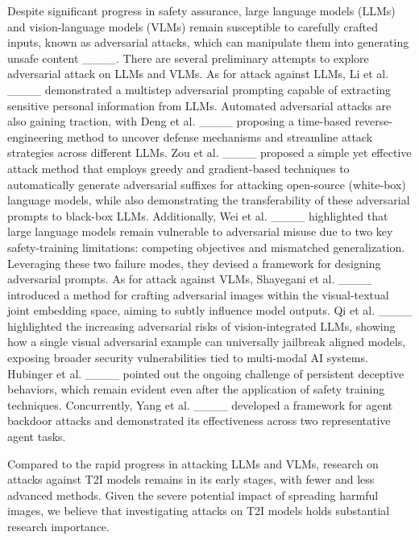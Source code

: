 Despite significant progress in safety assurance, large language models (LLMs) and vision-language models (VLMs) remain susceptible to carefully crafted inputs, known as adversarial attacks, which can manipulate them into generating unsafe content ____. There are several preliminary attempts to explore adversarial attack on LLMs and VLMs.
As for attack against LLMs, Li et al. ____ demonstrated a multistep adversarial prompting capable of extracting sensitive personal information from LLMs. 
Automated adversarial attacks are also gaining traction, with Deng et al. ____ proposing a time-based reverse-engineering method to uncover defense mechanisms and streamline attack strategies across different LLMs.
Zou et al. ____ proposed a simple yet effective attack method that employs greedy and gradient-based techniques to automatically generate adversarial suffixes for attacking open-source (white-box) language models, while also demonstrating the transferability of these adversarial prompts to black-box LLMs.
Additionally, Wei et al. ____ highlighted that large language models remain vulnerable to adversarial misuse due to two key safety-training limitations: competing objectives and mismatched generalization. Leveraging these two failure modes, they devised a framework for designing adversarial prompts.
As for attack against VLMs, Shayegani et al. ____ introduced a method for crafting adversarial images within the visual-textual joint embedding space, aiming to subtly influence model outputs.
Qi et al. ____ highlighted the increasing adversarial risks of vision-integrated LLMs, showing how a single visual adversarial example can universally jailbreak aligned models, exposing broader security vulnerabilities tied to multi-modal AI systems.
Hubinger et al. ____ pointed out the ongoing challenge of persistent deceptive behaviors, which remain evident even after the application of safety training techniques. 
Concurrently, Yang et al. ____ developed a framework for agent backdoor attacks and demonstrated its effectiveness across two representative agent tasks.



Compared to the rapid progress in attacking LLMs and VLMs, research on attacks against T2I models remains in its early stages, with fewer and less advanced methods. Given the severe potential impact of spreading harmful images, we believe that investigating attacks on T2I models holds substantial research importance.






